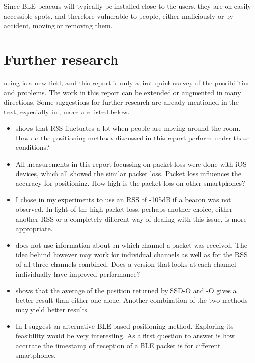 Since BLE beacons will typically be installed close to the users, they are on easily accessible spots, and therefore vulnerable to people, either maliciously or by accident, moving or removing them.

\section{Further research}
\Ptfp using \BLE is a new field, and this report is only a first quick survey of the possibilities and problems.
The work in this report can be extended or augmented in many directions.
Some suggestions for further research are already mentioned in the text, especially in , more are listed below.

\begin{itemize}
    \item {} shows that RSS fluctuates a lot when people are moving around the room.
        How do the positioning methods discussed in this report perform under those conditions?

    \item All measurements in this report focussing on packet loss were done with iOS devices, which all showed the similar packet loss.
        Packet loss influences the accuracy for positioning.
        How high is the packet loss on other smartphones?

    \item I chose in my experiments to use an RSS of -105dB if a beacon was not observed.
        In light of the high packet loss, perhaps another choice, either another RSS or a completely different way of dealing with this issue, is more appropriate.

    \item \aBRP does not use information about on which channel a packet was received.
        The idea behind \aBRP however may work for individual channels as well as for the RSS of all three channels combined.
        Does a \BRP version that looks at each channel individually have improved performance?

    \item {} shows that the average of the position returned by SSD-O and \aBRP-O gives a better result than either one alone.
        Another combination of the two methods may yield better results.

    \item In  I suggest an alternative BLE based positioning method.
        Exploring its feasibility would be very interesting.
        As a first question to answer is how accurate the timestamp of reception of a BLE packet is for different smartphones.
\end{itemize}
